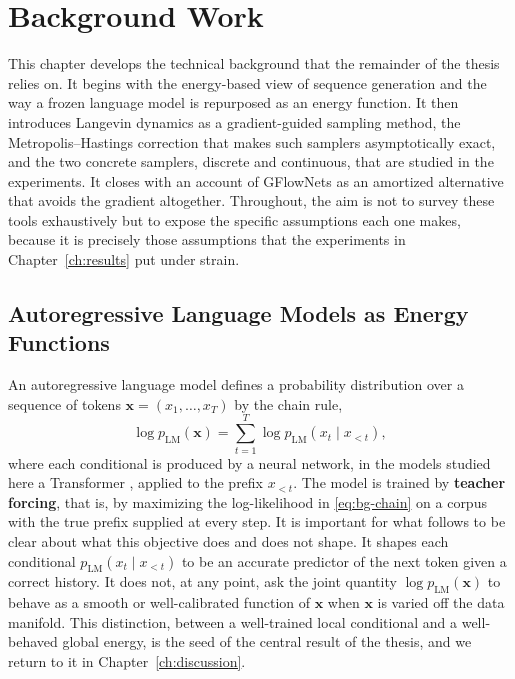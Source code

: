 \chapter{Background Work}
\label{ch:background}

This chapter develops the technical background that the remainder of the thesis relies on. It begins with the energy-based view of sequence generation and the way a frozen language model is repurposed as an energy function. It then introduces Langevin dynamics as a gradient-guided sampling method, the Metropolis--Hastings correction that makes such samplers asymptotically exact, and the two concrete samplers, discrete and continuous, that are studied in the experiments. It closes with an account of GFlowNets as an amortized alternative that avoids the gradient altogether. Throughout, the aim is not to survey these tools exhaustively but to expose the specific assumptions each one makes, because it is precisely those assumptions that the experiments in Chapter~\ref{ch:results} put under strain.

\section{Autoregressive Language Models as Energy Functions}
\label{sec:bg-ebm}

An autoregressive language model defines a probability distribution over a sequence of tokens $\bm{x} = (x_1, \dots, x_T)$ by the chain rule,
\begin{equation}
    \log p_{\text{LM}}(\bm{x}) = \sum_{t=1}^{T} \log p_{\text{LM}}(x_t \mid x_{<t}),
    \label{eq:bg-chain}
\end{equation}
where each conditional is produced by a neural network, in the models studied here a Transformer \citep{vaswani2017attention}, applied to the prefix $x_{<t}$. The model is trained by \textbf{teacher forcing}, that is, by maximizing the log-likelihood in \eqref{eq:bg-chain} on a corpus with the true prefix supplied at every step. It is important for what follows to be clear about what this objective does and does not shape. It shapes each conditional $p_{\text{LM}}(x_t \mid x_{<t})$ to be an accurate predictor of the next token given a correct history. It does not, at any point, ask the joint quantity $\log p_{\text{LM}}(\bm{x})$ to behave as a smooth or well-calibrated function of $\bm{x}$ when $\bm{x}$ is varied off the data manifold. This distinction, between a well-trained local conditional and a well-behaved global energy, is the seed of the central result of the thesis, and we return to it in Chapter~\ref{ch:discussion}.

